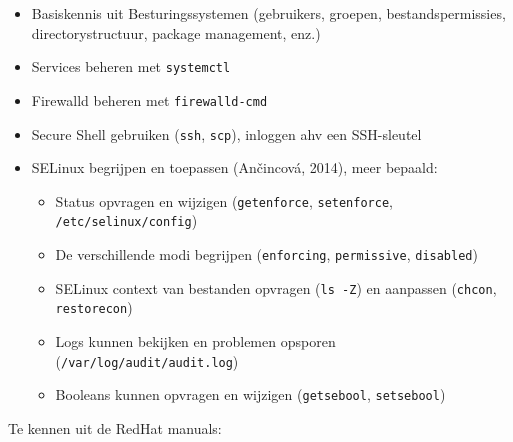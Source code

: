 \begin{itemize}
  \item Basiskennis uit Besturingssystemen (gebruikers, groepen, bestandspermissies, directorystructuur, package management, enz.)
  \item Services beheren met \texttt{systemctl}
  \item Firewalld beheren met \texttt{firewalld-cmd}
  \item Secure Shell gebruiken (\texttt{ssh}, \texttt{scp}), inloggen ahv een SSH-sleutel
  \item SELinux begrijpen en toepassen (Ančincová, 2014), meer bepaald:
  
  \begin{itemize}
    \item Status opvragen en wijzigen (\texttt{getenforce}, \texttt{setenforce}, \texttt{/etc/selinux/config})
    \item De verschillende modi begrijpen (\texttt{enforcing}, \texttt{permissive}, \texttt{disabled})
    \item SELinux context van bestanden opvragen (\texttt{ls\ -Z}) en aanpassen (\texttt{chcon}, \texttt{restorecon})
    \item Logs kunnen bekijken en problemen opsporen (\texttt{/var/log/audit/audit.log})
    \item Booleans kunnen opvragen en wijzigen (\texttt{getsebool}, \texttt{setsebool})
  \end{itemize}
\end{itemize}

Te kennen uit de RedHat manuals:

